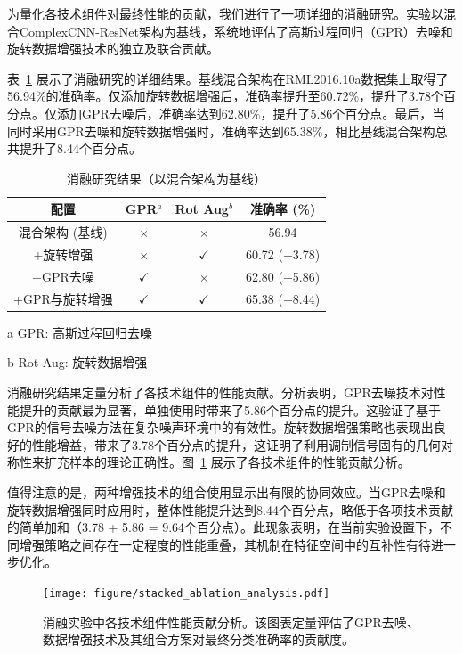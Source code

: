 \documentclass{article}
\begin{document}
为量化各技术组件对最终性能的贡献，我们进行了一项详细的消融研究。实验以混合ComplexCNN-ResNet架构为基线，系统地评估了高斯过程回归（GPR）去噪和旋转数据增强技术的独立及联合贡献。

表~\ref{tab:ablation_study} 展示了消融研究的详细结果。基线混合架构在RML2016.10a数据集上取得了56.94\%的准确率。仅添加旋转数据增强后，准确率提升至60.72\%，提升了3.78个百分点。仅添加GPR去噪后，准确率达到62.80\%，提升了5.86个百分点。最后，当同时采用GPR去噪和旋转数据增强时，准确率达到65.38\%，相比基线混合架构总共提升了8.44个百分点。

\begin{table}[!htbp]
\centering
\caption{消融研究结果（以混合架构为基线）}
\label{tab:ablation_study}
\begin{threeparttable}
\begin{tabular}{@{}cccc@{}}
\toprule
配置 & GPR$^{a}$ & Rot Aug$^{b}$ & 准确率 (\%) \\
\midrule
混合架构 (基线) & $\times$ & $\times$ & 56.94 \\
+旋转增强 & $\times$ & $\checkmark$ & 60.72 (+3.78) \\
+GPR去噪 & $\checkmark$ & $\times$ & 62.80 (+5.86) \\
+GPR与旋转增强 & $\checkmark$ & $\checkmark$ & 65.38 (+8.44) \\
\bottomrule
\end{tabular}
\begin{tablenotes}
\footnotesize
\item[a] GPR: 高斯过程回归去噪
\item[b] Rot Aug: 旋转数据增强
\end{tablenotes}
\end{threeparttable}
\end{table}

消融研究结果定量分析了各技术组件的性能贡献。分析表明，GPR去噪技术对性能提升的贡献最为显著，单独使用时带来了5.86个百分点的提升。这验证了基于GPR的信号去噪方法在复杂噪声环境中的有效性。旋转数据增强策略也表现出良好的性能增益，带来了3.78个百分点的提升，这证明了利用调制信号固有的几何对称性来扩充样本的理论正确性。图~\ref{fig:ablation_components} 展示了各技术组件的性能贡献分析。

值得注意的是，两种增强技术的组合使用显示出有限的协同效应。当GPR去噪和旋转数据增强同时应用时，整体性能提升达到8.44个百分点，略低于各项技术贡献的简单加和（3.78 + 5.86 = 9.64个百分点）。此现象表明，在当前实验设置下，不同增强策略之间存在一定程度的性能重叠，其机制在特征空间中的互补性有待进一步优化。

\begin{figure}[htbp]
\centering
\texttt{[image: figure/stacked\_ablation\_analysis.pdf]}
\caption{消融实验中各技术组件性能贡献分析。该图表定量评估了GPR去噪、数据增强技术及其组合方案对最终分类准确率的贡献度。}
\label{fig:ablation_components}
\end{figure}
\end{document}
